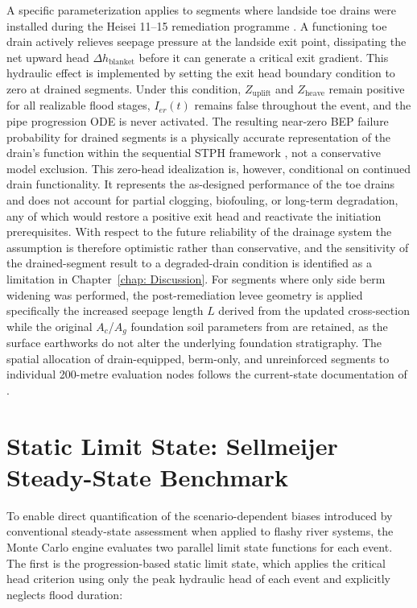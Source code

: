 A specific parameterization applies to segments where landside toe drains were installed during the Heisei 11--15 remediation programme \parencite{fukuda_2025_internal}. A functioning toe drain actively relieves seepage pressure at the landside exit point, dissipating the net upward head $\Delta h_\mathrm{blanket}$ before it can generate a critical exit gradient. This hydraulic effect is implemented by setting the exit head boundary condition to zero at drained segments. Under this condition, $Z_\mathrm{uplift}$ and $Z_\mathrm{heave}$ remain positive for all realizable flood stages, $I_{er}(t)$ remains false throughout the event, and the pipe progression ODE is never activated. The resulting near-zero BEP failure probability for drained segments is a physically accurate representation of the drain's function within the sequential STPH framework \parencite{ENW2017}, not a conservative model exclusion. This zero-head idealization is, however, conditional on continued drain functionality. It represents the as-designed performance of the toe drains and does not account for partial clogging, biofouling, or long-term degradation, any of which would restore a positive exit head and reactivate the initiation prerequisites. With respect to the future reliability of the drainage system the assumption is therefore optimistic rather than conservative, and the sensitivity of the drained-segment result to a degraded-drain condition is identified as a limitation in Chapter~\ref{chap: Discussion}. For segments where only side berm widening was performed, the post-remediation levee geometry is applied specifically the increased seepage length $L$ derived from the updated cross-section while the original $A_c$/$A_g$ foundation soil parameters from \textcite{oyo_1999} are retained, as the surface earthworks do not alter the underlying foundation stratigraphy. The spatial allocation of drain-equipped, berm-only, and unreinforced segments to individual 200-metre evaluation nodes follows the current-state documentation of \textcite{fukuda_2025_internal}.

\section{Static Limit State: Sellmeijer Steady-State Benchmark}
\label{sec: Static Limit State: Sellmeijer Steady-State Benchmark}

To enable direct quantification of the scenario-dependent biases introduced by conventional steady-state assessment when applied to flashy river systems, the Monte Carlo engine evaluates two parallel limit state functions for each event. The first is the progression-based static limit state, which applies the \textcite{sellmeijer_2011} critical head criterion using only the peak hydraulic head of each event and explicitly neglects flood duration:

